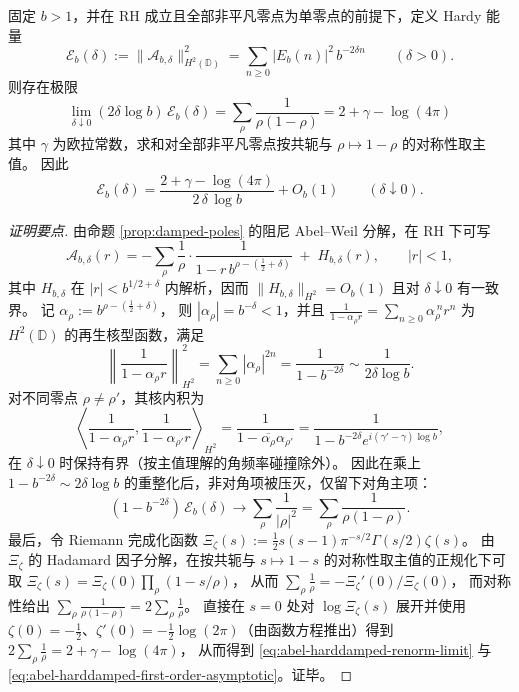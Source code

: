 \begin{theorem}\label{thm:abel-harddamped-universal-renorm-constant}
固定 \(b>1\)，并在 RH 成立且全部非平凡零点为单零点的前提下，定义 Hardy 能量
\[
\mathcal E_b(\delta):=\|\mathcal A_{b,\delta}\|_{H^2(\mathbb D)}^2
=\sum_{n\ge 0}\bigl|E_b(n)\bigr|^2\,b^{-2\delta n}
\qquad(\delta>0).
\]
则存在极限
\begin{equation}\label{eq:abel-harddamped-renorm-limit}
\boxed{\;
\lim_{\delta\downarrow 0}(2\delta\log b)\,\mathcal E_b(\delta)
=\sum_{\rho}\frac{1}{\rho(1-\rho)}
=2+\gamma-\log(4\pi)\;}
\end{equation}
其中 \(\gamma\) 为欧拉常数，求和对全部非平凡零点按共轭与 \(\rho\mapsto 1-\rho\) 的对称性取主值。
因此
\begin{equation}\label{eq:abel-harddamped-first-order-asymptotic}
\boxed{\;
\mathcal E_b(\delta)=\frac{2+\gamma-\log(4\pi)}{2\,\delta\,\log b}+O_b(1)\qquad(\delta\downarrow 0).\;}
\end{equation}
\end{theorem}
\begin{proof}[证明要点]
由命题 \ref{prop:damped-poles} 的阻尼 Abel--Weil 分解，在 RH 下可写
\[
\mathcal A_{b,\delta}(r)
=-\sum_{\rho}\frac{1}{\rho}\cdot\frac{1}{1-r\,b^{\rho-(\frac12+\delta)}}\;+\;H_{b,\delta}(r),
\qquad |r|<1,
\]
其中 \(H_{b,\delta}\) 在 \(|r|<b^{1/2+\delta}\) 内解析，因而 \(\|H_{b,\delta}\|_{H^2}=O_b(1)\) 且对 \(\delta\downarrow 0\) 有一致界。
记
\(
\alpha_\rho:=b^{\rho-(\frac12+\delta)}
\)，
则 \(|\alpha_\rho|=b^{-\delta}<1\)，并且
\(
\frac{1}{1-\alpha_\rho r}=\sum_{n\ge 0}\alpha_\rho^{\,n}r^n
\)
为 \(H^2(\mathbb D)\) 的再生核型函数，满足
\[
\left\|\frac{1}{1-\alpha_\rho r}\right\|_{H^2}^2=\sum_{n\ge 0}|\alpha_\rho|^{2n}=\frac{1}{1-b^{-2\delta}}
\sim \frac{1}{2\delta\log b}.
\]
对不同零点 \(\rho\neq\rho'\)，其核内积为
\[
\left\langle \frac{1}{1-\alpha_\rho r},\frac{1}{1-\alpha_{\rho'} r}\right\rangle_{H^2}
=\frac{1}{1-\overline{\alpha_\rho}\alpha_{\rho'}}
=\frac{1}{1-b^{-2\delta}e^{i(\gamma'-\gamma)\log b}},
\]
在 \(\delta\downarrow 0\) 时保持有界（按主值理解的角频率碰撞除外）。
因此在乘上 \(1-b^{-2\delta}\sim 2\delta\log b\) 的重整化后，非对角项被压灭，仅留下对角主项：
\[
(1-b^{-2\delta})\,\mathcal E_b(\delta)\to \sum_{\rho}\frac{1}{|\rho|^2}
=\sum_{\rho}\frac{1}{\rho(1-\rho)}.
\]
最后，令 Riemann 完成化函数
\(
\Xi_\zeta(s):=\frac12 s(s-1)\pi^{-s/2}\Gamma(s/2)\zeta(s)
\)。
由 \(\Xi_\zeta\) 的 Hadamard 因子分解，在按共轭与 \(s\mapsto 1-s\) 的对称性取主值的正规化下可取
\(
\Xi_\zeta(s)=\Xi_\zeta(0)\prod_\rho(1-s/\rho)
\)，
从而
\(
\sum_\rho \frac{1}{\rho}=-\Xi_\zeta'(0)/\Xi_\zeta(0)
\)，
而对称性给出 \(\sum_\rho \frac{1}{\rho(1-\rho)}=2\sum_\rho \frac{1}{\rho}\)。
直接在 \(s=0\) 处对 \(\log\Xi_\zeta(s)\) 展开并使用 \(\zeta(0)=-\tfrac12\)、\(\zeta'(0)=-\tfrac12\log(2\pi)\)（由函数方程推出）得到
\(
2\sum_\rho \frac{1}{\rho}=2+\gamma-\log(4\pi)
\)，
从而得到 \eqref{eq:abel-harddamped-renorm-limit} 与 \eqref{eq:abel-harddamped-first-order-asymptotic}。证毕。
\end{proof}

